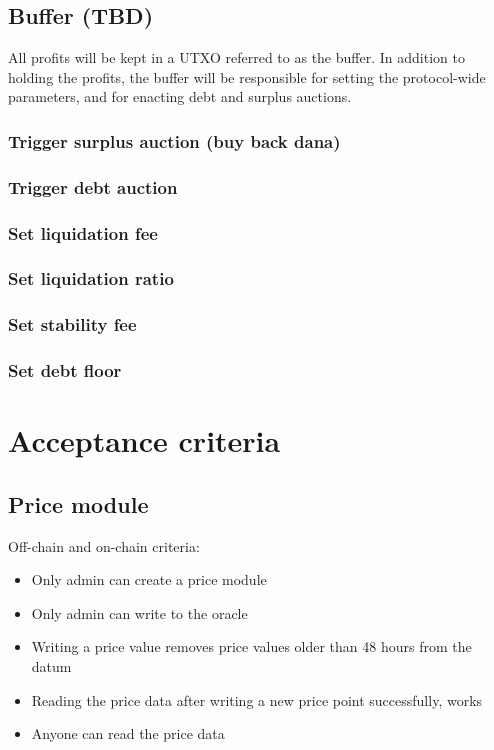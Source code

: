 \documentclass{article} %
\begin{document}
\subsection{Buffer (TBD)}

All profits will be kept in a UTXO referred to as the buffer.
In addition to holding the profits, the buffer will be responsible for setting
the protocol-wide parameters, and for enacting debt and surplus auctions.

\subsubsection{Trigger surplus auction (buy back dana)}

\subsubsection{Trigger debt auction}

\subsubsection{Set liquidation fee}

\subsubsection{Set liquidation ratio}

\subsubsection{Set stability fee}

\subsubsection{Set debt floor}

\section{Acceptance criteria}

\subsection{Price module}

Off-chain and on-chain criteria:
\begin{itemize}
  \item Only admin can create a price module
  \item Only admin can write to the oracle
  \item Writing a price value removes price values older than 48 hours from the
    datum
  \item Reading the price data after writing a new price point successfully,
    works
  \item Anyone can read the price data
\end{itemize}
\end{document}
